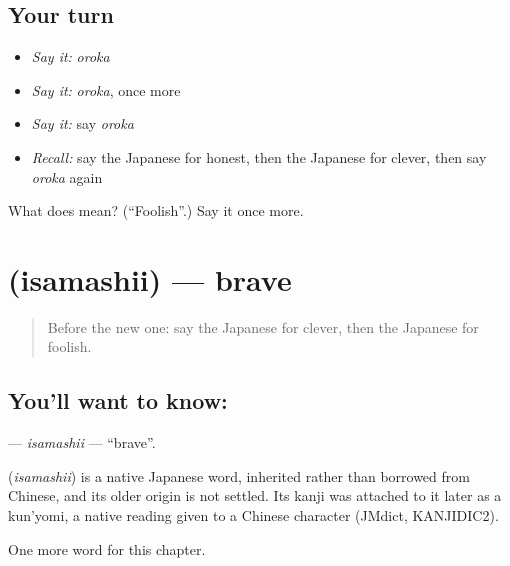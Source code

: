 \subsection*{Your turn}
\begin{itemize}
\raggedright
  \item \emph{Say it:} \emph{oroka}
  \item \emph{Say it:} \emph{oroka}, once more
  \item \emph{Say it:} say \emph{oroka}
  \item \emph{Recall:} say the Japanese for honest, then the Japanese for clever, then say \emph{oroka} again
\end{itemize}

\begin{tcolorbox}[breakable,colback=teal!4,colframe=teal!35!black,title={Before you move on}]
What does  mean? (\textquotedblleft{}Foolish\textquotedblright{}.) Say it once more.
\end{tcolorbox}
\section[\texorpdfstring{\ja{いさましい} (isamashii)}{いさましい (isamashii)}]{ (isamashii) — brave}

\label{lesson:JA-C128-isamashii}



\begin{quote}
Before the new one: say the Japanese for clever, then the Japanese for foolish.
\end{quote}

\subsection*{You'll want to know: }
\textbf{} — \emph{isamashii} — \textquotedblleft{}brave\textquotedblright{}.

\begin{cousinweb}
\textbf{} (\emph{isamashii}) is a native Japanese word, inherited rather than borrowed from Chinese, and its older origin is not settled. Its kanji was attached to it later as a kun'yomi, a native reading given to a Chinese character (JMdict, KANJIDIC2).
\end{cousinweb}

\begin{grammarlens}[title={What you've built}]
One more word for this chapter.
\end{grammarlens}

